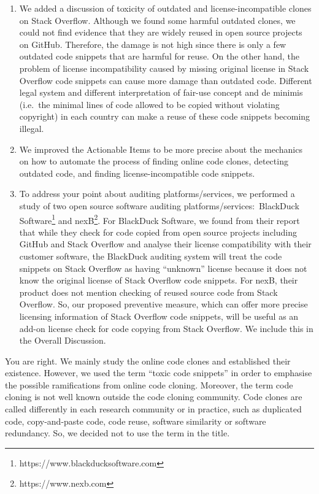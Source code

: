 \documentclass[a4paper,twoside,10pt]{reviewresponse}
\begin{document}
\begin{enumerate}
	\item We added a discussion of toxicity of outdated and license-incompatible clones on Stack Overflow. Although we found some harmful outdated clones, we could not find evidence that they are widely reused in open source projects on GitHub. Therefore, the damage is not high since there is only a few outdated code snippets that are harmful for reuse. On the other hand, the problem of license incompatibility caused by missing original license in Stack Overflow code snippets can cause more damage than outdated code. Different legal system and different interpretation of fair-use concept and de minimis (i.e.~the minimal lines of code allowed to be copied without violating copyright) in each country can make a reuse of these code snippets becoming illegal. 
	
	\item We improved the Actionable Items to be more precise about the mechanics on how to automate the process of finding online code clones, detecting outdated code, and finding license-incompatible code snippets.
	
	\item To address your point about auditing platforms/services, 
	we performed a study of two open source software auditing
	platforms/services:~BlackDuck
	Software\footnote{https://www.blackducksoftware.com} and
	nexB\footnote{https://www.nexb.com}. For BlackDuck Software, we found from their
	report~\cite{CORSI2017} that while they check for code copied from open source
	projects including GitHub and Stack Overflow and analyse their license
	compatibility with their customer software, the BlackDuck auditing system will
	treat the code snippets on Stack Overflow as having ``unknown'' license because
	it does not know the original license of Stack Overflow code snippets. For nexB,
	their product does not mention checking of reused source code from Stack
	Overflow. So, our proposed preventive measure, which can offer more precise licensing
	information of Stack Overflow code snippets, will be useful as an add-on license
	check for code copying from Stack Overflow. We include this in the Overall Discussion.
\end{enumerate} 


You are right. We mainly study the online code clones and established their existence. However, we used the term ``toxic code snippets'' in order to emphasise the possible ramifications from online code cloning. 
Moreover, the term code cloning is not well known outside the code cloning community. Code clones are called differently in each research community or in practice, such as duplicated code, copy-and-paste code, code reuse, software similarity or software redundancy. So, we decided not to use the term in the title. 
\end{document}
